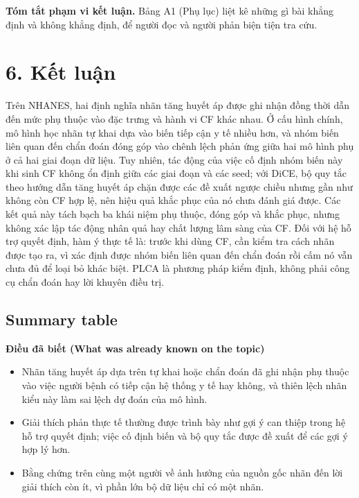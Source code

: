 \documentclass[9pt,a4paper]{extarticle}
\providecommand{\tightlist}{\setlength{\itemsep}{0pt}\setlength{\parskip}{0pt}}
\begin{document}
\textbf{Tóm tắt phạm vi kết luận.} Bảng A1 (Phụ lục) liệt kê những gì
bài khẳng định và không khẳng định, để người đọc và người phản biện tiện
tra cứu.

\section{6. Kết luận}

Trên NHANES, hai định nghĩa nhãn tăng huyết áp được ghi nhận đồng thời
dẫn đến mức phụ thuộc vào đặc trưng và hành vi CF khác nhau. Ở cấu hình
chính, mô hình học nhãn tự khai dựa vào biến tiếp cận y tế nhiều hơn, và
nhóm biến liên quan đến chẩn đoán đóng góp vào chênh lệch phản ứng giữa
hai mô hình phụ ở cả hai giai đoạn dữ liệu. Tuy nhiên, tác động của việc
cố định nhóm biến này khi sinh CF không ổn định giữa các giai đoạn và
các seed; với DiCE, bộ quy tắc theo hướng dẫn tăng huyết áp chặn được
các đề xuất ngược chiều nhưng gần như không còn CF hợp lệ, nên hiệu quả
khắc phục của nó chưa đánh giá được. Các kết quả này tách bạch ba khái
niệm phụ thuộc, đóng góp và khắc phục, nhưng không xác lập tác động nhân
quả hay chất lượng lâm sàng của CF. Đối với hệ hỗ trợ quyết định, hàm ý
thực tế là: trước khi dùng CF, cần kiểm tra cách nhãn được tạo ra, vì
xác định được nhóm biến liên quan đến chẩn đoán rồi cấm nó vẫn chưa đủ
để loại bỏ khác biệt. PLCA là phương pháp kiểm định, không phải công cụ
chẩn đoán hay lời khuyên điều trị.

\subsection{Summary table}

\textbf{Điều đã biết (What was already known on the topic)}

\begin{itemize}
\tightlist
\item
  Nhãn tăng huyết áp dựa trên tự khai hoặc chẩn đoán đã ghi nhận phụ
  thuộc vào việc người bệnh có tiếp cận hệ thống y tế hay không, và
  thiên lệch nhãn kiểu này làm sai lệch dự đoán của mô hình.
\item
  Giải thích phản thực tế thường được trình bày như gợi ý can thiệp
  trong hệ hỗ trợ quyết định; việc cố định biến và bộ quy tắc được đề
  xuất để các gợi ý hợp lý hơn.
\item
  Bằng chứng trên cùng một người về ảnh hưởng của nguồn gốc nhãn đến lời
  giải thích còn ít, vì phần lớn bộ dữ liệu chỉ có một nhãn.
\end{itemize}
\end{document}
